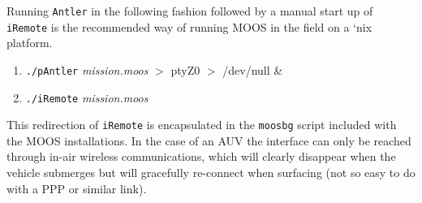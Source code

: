 \documentclass[a4paper,10pt]{article}
\newcommand{\Code}[1]{\texttt{#1} }
\newcommand{\code}[1]{\Code{#1} }
\begin{document}
Running \code{Antler} in the following fashion followed by a
manual start up of \code{iRemote} is the recommended way of
running MOOS in the field on a `nix platform.

\begin{enumerate}
\item \code{./pAntler} {\it{mission.moos}} $>$ ptyZ0 $>$ /dev/null \&
\item \code{./iRemote} {\it{mission.moos}}
\end{enumerate}

This redirection of \code{iRemote} is encapsulated in the
\code{moosbg} script included with the MOOS installations. In the
case of an AUV the interface can only be reached  through in-air
wireless communications, which will clearly disappear when the
vehicle submerges but will gracefully re-connect when surfacing
(not so easy to do with a PPP or similar link).
\end{document}
